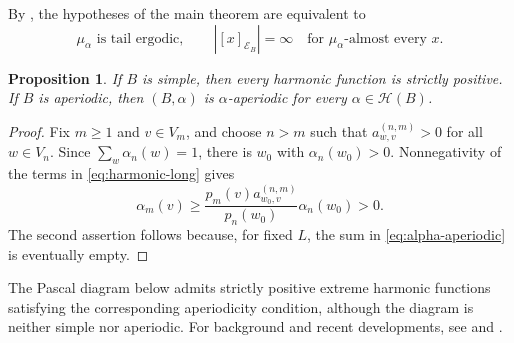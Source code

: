 \documentclass[11pt]{amsart}
\newtheorem{proposition}[theorem]{Proposition}
\theoremstyle{definition}
\theoremstyle{remark}
\begin{document}
By , the hypotheses of the main
theorem are equivalent to
\[
 \mu_\alpha\text{ is tail ergodic},\qquad
 |[x]_{\mathcal E_B}|=\infty
       \quad\text{for }\mu_\alpha\text{-almost every }x.
\]

\begin{proposition}\label{prop:simple-positive}
If $B$ is simple, then every harmonic function is strictly positive.
If $B$ is aperiodic, then $(B,\alpha)$ is $\alpha$-aperiodic for every
$\alpha\in\mathcal H(B)$.
\end{proposition}

\begin{proof}
Fix $m\geq1$ and $v\in V_m$, and choose $n>m$ such that
$a_{w,v}^{(n,m)}>0$ for all $w\in V_n$.
Since $\sum_w\alpha_n(w)=1$, there is $w_0$ with $\alpha_n(w_0)>0$.
Nonnegativity of the terms in \eqref{eq:harmonic-long} gives
\[
 \alpha_m(v)\geq
 \frac{p_m(v)a_{w_0,v}^{(n,m)}}{p_n(w_0)}\alpha_n(w_0)>0.
\]
The second assertion follows because, for fixed $L$, the sum in
\eqref{eq:alpha-aperiodic} is eventually empty.
\end{proof}

The Pascal diagram below admits strictly positive extreme harmonic functions
satisfying the corresponding aperiodicity condition, although the diagram
is neither simple nor aperiodic.  For background and recent developments,
see \cite[Section~5.2]{Vershik2014} and \cite{BezuglyiDudkoKarpel2026}.
\end{document}
